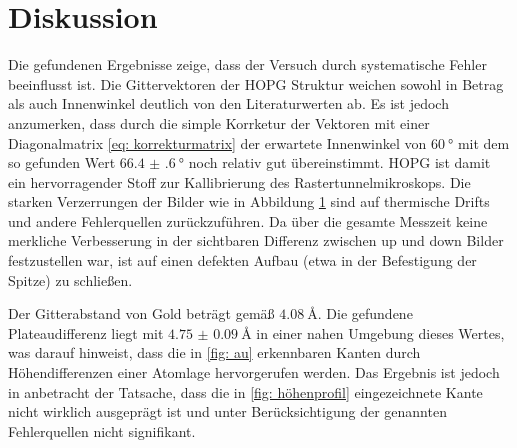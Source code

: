 \section{Diskussion}
Die gefundenen Ergebnisse zeige, dass der Versuch durch systematische Fehler beeinflusst ist.
Die Gittervektoren der HOPG Struktur weichen sowohl in Betrag als auch Innenwinkel
deutlich von den Literaturwerten ab. Es ist jedoch anzumerken, dass durch die simple Korrketur der Vektoren
mit einer Diagonalmatrix \eqref{eq: korrekturmatrix} der erwartete Innenwinkel von $\SI{60}{\degree}$ mit dem so
gefunden Wert $\SI{66.4(6)}{\degree}$ noch relativ gut übereinstimmt. HOPG ist damit ein hervorragender Stoff
zur Kallibrierung des Rastertunnelmikroskops.
Die starken Verzerrungen der Bilder wie in Abbildung \ref{} sind auf thermische Drifts und andere Fehlerquellen
zurückzuführen. Da über die gesamte Messzeit keine merkliche Verbesserung in der sichtbaren Differenz zwischen
up und down Bilder festzustellen war, ist auf einen defekten Aufbau (etwa in der Befestigung der Spitze) zu schließen.

Der Gitterabstand von Gold beträgt gemäß \cite{} $\SI{4.08}{\angstrom}$. Die gefundene Plateaudifferenz
liegt mit $\SI{4.75(9)}{\angstrom}$ in einer nahen Umgebung dieses Wertes, was darauf hinweist,
dass die in \ref{fig: au} erkennbaren Kanten durch Höhendifferenzen einer Atomlage hervorgerufen werden.
Das Ergebnis ist jedoch in anbetracht der Tatsache,
dass die in \ref{fig: höhenprofil} eingezeichnete Kante nicht wirklich ausgeprägt ist
und unter Berücksichtigung der genannten Fehlerquellen nicht signifikant.
